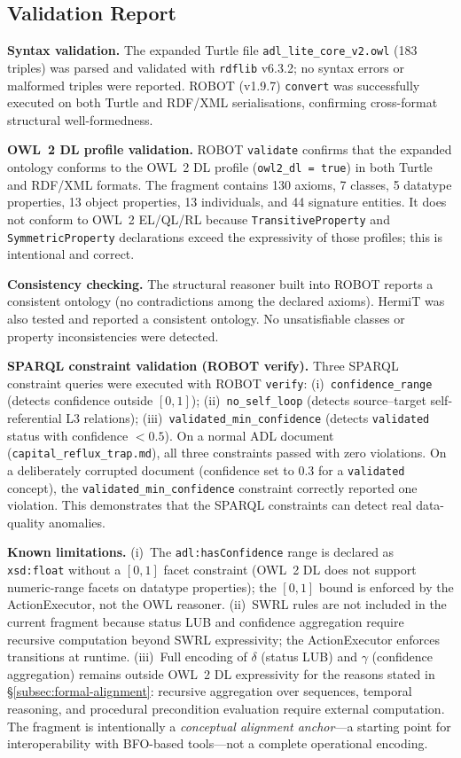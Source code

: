 \subsection{Validation Report}

\textbf{Syntax validation.} The expanded Turtle file \texttt{adl\_lite\_core\_v2.owl} (183 triples) was parsed and validated with \texttt{rdflib} v6.3.2; no syntax errors or malformed triples were reported. ROBOT (v1.9.7) \texttt{convert} was successfully executed on both Turtle and RDF/XML serialisations, confirming cross-format structural well-formedness.

\textbf{OWL~2 DL profile validation.} ROBOT \texttt{validate} confirms that the expanded ontology conforms to the OWL~2 DL profile (\texttt{owl2\_dl = true}) in both Turtle and RDF/XML formats. The fragment contains 130 axioms, 7 classes, 5 datatype properties, 13 object properties, 13 individuals, and 44 signature entities. It does not conform to OWL~2 EL/QL/RL because \texttt{TransitiveProperty} and \texttt{SymmetricProperty} declarations exceed the expressivity of those profiles; this is intentional and correct.

\textbf{Consistency checking.} The structural reasoner built into ROBOT reports a consistent ontology (no contradictions among the declared axioms). HermiT was also tested and reported a consistent ontology. No unsatisfiable classes or property inconsistencies were detected.

\textbf{SPARQL constraint validation (ROBOT verify).} Three SPARQL constraint queries were executed with ROBOT \texttt{verify}: (i)~\texttt{confidence\_range} (detects confidence outside $[0,1]$); (ii)~\texttt{no\_self\_loop} (detects source--target self-referential L3 relations); (iii)~\texttt{validated\_min\_confidence} (detects \texttt{validated} status with confidence $< 0.5$). On a normal ADL document (\texttt{capital\_reflux\_trap.md}), all three constraints passed with zero violations. On a deliberately corrupted document (confidence set to 0.3 for a \texttt{validated} concept), the \texttt{validated\_min\_confidence} constraint correctly reported one violation. This demonstrates that the SPARQL constraints can detect real data-quality anomalies.

\textbf{Known limitations.} (i)~The \texttt{adl:hasConfidence} range is declared as \texttt{xsd:float} without a $[0,1]$ facet constraint (OWL~2 DL does not support numeric-range facets on datatype properties); the $[0,1]$ bound is enforced by the ActionExecutor, not the OWL reasoner. (ii)~SWRL rules are not included in the current fragment because status LUB and confidence aggregation require recursive computation beyond SWRL expressivity; the ActionExecutor enforces transitions at runtime. (iii)~Full encoding of $\delta$ (status LUB) and $\gamma$ (confidence aggregation) remains outside OWL~2 DL expressivity for the reasons stated in \S\ref{subsec:formal-alignment}: recursive aggregation over sequences, temporal reasoning, and procedural precondition evaluation require external computation. The fragment is intentionally a \emph{conceptual alignment anchor}---a starting point for interoperability with BFO-based tools---not a complete operational encoding.
